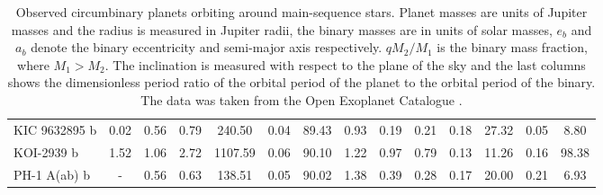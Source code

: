 \documentclass[ twoside,openright,titlepage,numbers=noenddot,headinclude,%
                footinclude=true,cleardoublepage=empty,abstractoff, %
                BCOR=5mm,paper=a4,fontsize=11pt,%
                american,%
                ]{scrreprt}
\begin{document}
\begin{table}
\begin{tabular}{lccccccccccccc}
    KIC 9632895 b    &  0.02 &  0.56 &  0.79 &   240.50 &  0.04 &  89.43 &    0.93 &    0.19 &  0.21 &      0.18 &     27.32 &      0.05 &       8.80 \\
    KOI-2939 b       &  1.52 &  1.06 &  2.72 &  1107.59 &  0.06 &  90.10 &    1.22 &    0.97 &  0.79 &      0.13 &     11.26 &      0.16 &      98.38 \\
    PH-1 A(ab) b     &   - &  0.56 &  0.63 &   138.51 &  0.05 &  90.02 &    1.38 &    0.39 &  0.28 &      0.17 &     20.00 &      0.21 &       6.93 \\
\bottomrule
\end{tabular}\caption{Observed circumbinary planets orbiting around main-sequence
    stars. Planet masses are units of Jupiter masses and the radius is measured
    in Jupiter radii, the binary masses are in units of solar masses, $e_b$ and
    $a_b$ denote the binary eccentricity and semi-major axis respectively. $qM_2/M_1$ is the 
    binary mass fraction, where $M_1>M_2$. The inclination is measured with
    respect to the plane of the sky and the last columns shows the dimensionless 
    period ratio of the orbital period of the planet to the orbital period of the
    binary. The data was taken from the Open Exoplanet Catalogue \citep{catalogue}.}
\label{table:kepler_planets}
\end{table}
\end{document}
